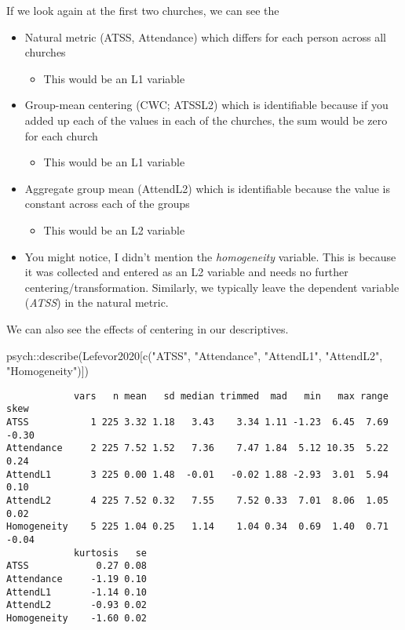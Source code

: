 \documentclass[
  11pt,
]{book}
\newenvironment{Shaded}{\begin{snugshade}}{\end{snugshade}}
\newcommand{\FunctionTok}[1]{\textcolor[rgb]{0.00,0.00,0.00}{#1}}
\newcommand{\NormalTok}[1]{#1}
\newcommand{\SpecialCharTok}[1]{\textcolor[rgb]{0.00,0.00,0.00}{#1}}
\newcommand{\StringTok}[1]{\textcolor[rgb]{0.31,0.60,0.02}{#1}}
\providecommand{\tightlist}{%
  \setlength{\itemsep}{0pt}\setlength{\parskip}{0pt}}
\begin{document}
If we look again at the first two churches, we can see the

\begin{itemize}
\tightlist
\item
  Natural metric (ATSS, Attendance) which differs for each person across all churches

  \begin{itemize}
  \tightlist
  \item
    This would be an L1 variable
  \end{itemize}
\item
  Group-mean centering (CWC; ATSSL2) which is identifiable because if you added up each of the values in each of the churches, the sum would be zero for each church

  \begin{itemize}
  \tightlist
  \item
    This would be an L1 variable
  \end{itemize}
\item
  Aggregate group mean (AttendL2) which is identifiable because the value is constant across each of the groups

  \begin{itemize}
  \tightlist
  \item
    This would be an L2 variable
  \end{itemize}
\item
  You might notice, I didn't mention the \emph{homogeneity} variable. This is because it was collected and entered as an L2 variable and needs no further centering/transformation. Similarly, we typically leave the dependent variable (\emph{ATSS}) in the natural metric.
\end{itemize}

We can also see the effects of centering in our descriptives.

\begin{Shaded}
\begin{Highlighting}[]
\NormalTok{psych}\SpecialCharTok{::}\FunctionTok{describe}\NormalTok{(Lefevor2020[}\FunctionTok{c}\NormalTok{(}\StringTok{"ATSS"}\NormalTok{, }\StringTok{"Attendance"}\NormalTok{, }\StringTok{"AttendL1"}\NormalTok{, }\StringTok{"AttendL2"}\NormalTok{, }\StringTok{"Homogeneity"}\NormalTok{)])}
\end{Highlighting}
\end{Shaded}

\begin{verbatim}
            vars   n mean   sd median trimmed  mad   min   max range  skew
ATSS           1 225 3.32 1.18   3.43    3.34 1.11 -1.23  6.45  7.69 -0.30
Attendance     2 225 7.52 1.52   7.36    7.47 1.84  5.12 10.35  5.22  0.24
AttendL1       3 225 0.00 1.48  -0.01   -0.02 1.88 -2.93  3.01  5.94  0.10
AttendL2       4 225 7.52 0.32   7.55    7.52 0.33  7.01  8.06  1.05  0.02
Homogeneity    5 225 1.04 0.25   1.14    1.04 0.34  0.69  1.40  0.71 -0.04
            kurtosis   se
ATSS            0.27 0.08
Attendance     -1.19 0.10
AttendL1       -1.14 0.10
AttendL2       -0.93 0.02
Homogeneity    -1.60 0.02
\end{verbatim}
\end{document}
